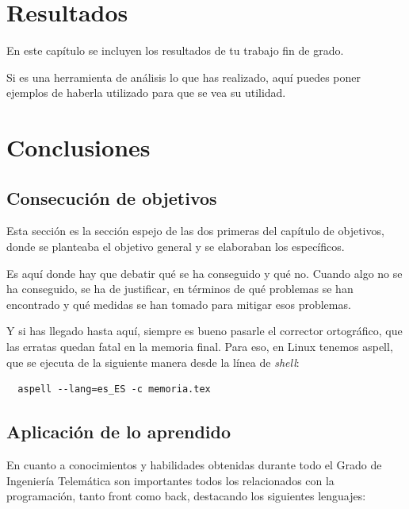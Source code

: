 \documentclass[a4paper, 12pt]{book}
\begin{document}
\cleardoublepage
\chapter{Resultados}

En este capítulo se incluyen los resultados de tu trabajo fin de grado.

Si es una herramienta de análisis lo que has realizado, aquí puedes poner ejemplos de haberla utilizado para que se vea su utilidad.



\cleardoublepage
\chapter{Conclusiones}
\label{chap:conclusiones}


\section{Consecución de objetivos}
\label{sec:consecucion-objetivos}

Esta sección es la sección espejo de las dos primeras del capítulo de objetivos, donde se planteaba el objetivo general y se elaboraban los específicos.

Es aquí donde hay que debatir qué se ha conseguido y qué no. 
Cuando algo no se ha conseguido, se ha de justificar, en términos de qué problemas se han encontrado y qué medidas se han tomado para mitigar esos problemas.

Y si has llegado hasta aquí, siempre es bueno pasarle el corrector ortográfico, que las erratas quedan fatal en la memoria final.
Para eso, en Linux tenemos aspell, que se ejecuta de la siguiente manera desde la línea de \emph{shell}:

\begin{verbatim}
  aspell --lang=es_ES -c memoria.tex
\end{verbatim}

\section{Aplicación de lo aprendido}
\label{sec:aplicacion}

En cuanto a conocimientos y habilidades obtenidas durante todo el Grado de Ingeniería Telemática son importantes todos los relacionados con la programación, tanto front como back, destacando los siguientes lenguajes:
\end{document}
